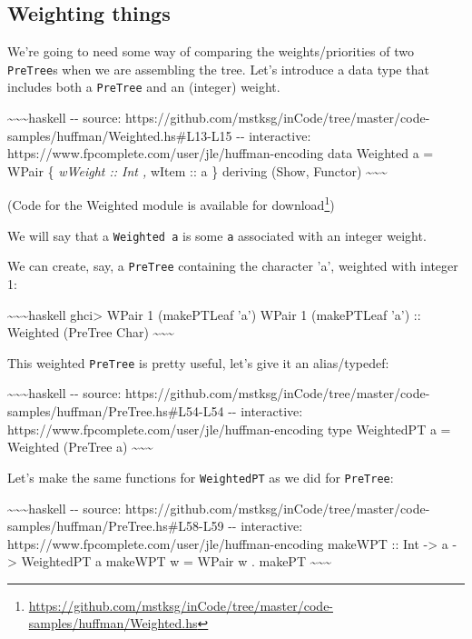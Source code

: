 \documentclass[]{article}
\renewcommand{\href}[2]{#2\footnote{\url{#1}}}
\begin{document}
\subsection{Weighting things}

We're going to need some way of comparing the weights/priorities of two
\texttt{PreTree}s when we are assembling the tree. Let's introduce a data type
that includes both a \texttt{PreTree} and an (integer) weight.

\textasciitilde{}\textasciitilde{}\textasciitilde{}haskell -\/- source:
https://github.com/mstksg/inCode/tree/master/code-samples/huffman/Weighted.hs\#L13-L15
-\/- interactive: https://www.fpcomplete.com/user/jle/huffman-encoding data
Weighted a = WPair \{ \emph{wWeight :: Int , }wItem :: a \} deriving (Show,
Functor) \textasciitilde{}\textasciitilde{}\textasciitilde{}

(Code for the Weighted module is
\href{https://github.com/mstksg/inCode/tree/master/code-samples/huffman/Weighted.hs}{available
for download})

We will say that a \texttt{Weighted\ a} is some \texttt{a} associated with an
integer weight.

We can create, say, a \texttt{PreTree} containing the character 'a', weighted
with integer 1:

\textasciitilde{}\textasciitilde{}\textasciitilde{}haskell ghci\textgreater{}
WPair 1 (makePTLeaf 'a') WPair 1 (makePTLeaf 'a') :: Weighted (PreTree Char)
\textasciitilde{}\textasciitilde{}\textasciitilde{}

This weighted \texttt{PreTree} is pretty useful, let's give it an alias/typedef:

\textasciitilde{}\textasciitilde{}\textasciitilde{}haskell -\/- source:
https://github.com/mstksg/inCode/tree/master/code-samples/huffman/PreTree.hs\#L54-L54
-\/- interactive: https://www.fpcomplete.com/user/jle/huffman-encoding type
WeightedPT a = Weighted (PreTree a)
\textasciitilde{}\textasciitilde{}\textasciitilde{}

Let's make the same functions for \texttt{WeightedPT} as we did for
\texttt{PreTree}:

\textasciitilde{}\textasciitilde{}\textasciitilde{}haskell -\/- source:
https://github.com/mstksg/inCode/tree/master/code-samples/huffman/PreTree.hs\#L58-L59
-\/- interactive: https://www.fpcomplete.com/user/jle/huffman-encoding makeWPT
:: Int -\textgreater{} a -\textgreater{} WeightedPT a makeWPT w = WPair w .
makePT \textasciitilde{}\textasciitilde{}\textasciitilde{}
\end{document}
